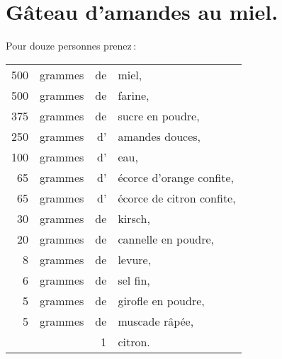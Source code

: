 \section*{\centering Gâteau d'amandes au miel.}
{}

Pour douze personnes prenez :

\footnotesize
\begin{longtable}{rrrp{16em}}
    500 & grammes & de & miel,                                                                            \\
    500 & grammes & de & farine,                                                                          \\
    375 & grammes & de & sucre en poudre,                                                                 \\
    250 & grammes & d' & amandes douces,                                                                  \\
    100 & grammes & d' & eau,                                                                             \\
     65 & grammes & d' & écorce d'orange confite,                                                         \\
     65 & grammes & d' & écorce de citron confite,                                                        \\
     30 & grammes & de & kirsch,                                                                          \\
     20 & grammes & de & cannelle en poudre,                                                              \\
      8 & grammes & de & levure,                                                                          \\
      6 & grammes & de & sel fin,                                                                         \\
      5 & grammes & de & girofle en poudre,                                                               \\
      5 & grammes & de & muscade râpée,                                                                   \\
        &         &  1 & citron.                                                                          \\
\end{longtable}
\normalsize

